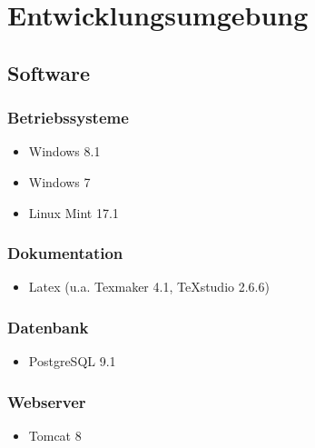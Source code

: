 \documentclass[a4paper]{scrreprt}
\begin{document}
\chapter{Entwicklungsumgebung}
    \section{Software}
        \subsection{Betriebssysteme}
            \begin{itemize}
            	\item Windows 8.1
            	\item Windows 7
            	\item Linux Mint 17.1
            \end{itemize}	
            
        \subsection{Dokumentation}
            \begin{itemize}
            	\item Latex (u.a. Texmaker 4.1, TeXstudio 2.6.6)
            \end{itemize}
            
        \subsection{Datenbank}
           \begin{itemize}
           	\item PostgreSQL 9.1
           \end{itemize}
           
        \subsection{Webserver}
            \begin{itemize}
            	\item Tomcat 8
            \end{itemize}
            
\end{document}

